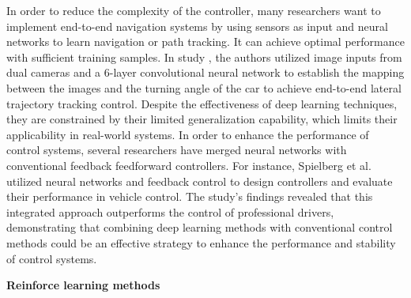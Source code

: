 \documentclass[sn-mathphys]{sn-jnl}%
\theoremstyle{thmstyleone}%
\theoremstyle{thmstyletwo}%
\theoremstyle{thmstylethree}%
\begin{document}
In order to reduce the complexity of the controller, many researchers want to implement end-to-end navigation systems by using sensors as input and neural networks to learn navigation or path tracking. It can achieve optimal performance with sufficient training samples\cite{bojarskiEndEndLearning2016}.
In study \cite{mullerOffroadObstacleAvoidance2005}, the authors utilized image inputs from dual cameras and a 6-layer convolutional neural network to establish the mapping between the images and the turning angle of the car to achieve end-to-end lateral trajectory tracking control. 
Despite the effectiveness of deep learning techniques, they are constrained by their limited generalization capability, which limits their applicability in real-world systems. In order to enhance the performance of control systems, several researchers have merged neural networks with conventional feedback feedforward controllers. For instance, Spielberg et al. \cite{spielbergNeuralNetworkVehicle2019} utilized neural networks and feedback control to design controllers and evaluate their performance in vehicle control. The study's findings revealed that this integrated approach outperforms the control of professional drivers, demonstrating that combining deep learning methods with conventional control methods could be an effective strategy to enhance the performance and stability of control systems.

\textbf{Reinforce learning methods}
\end{document}
